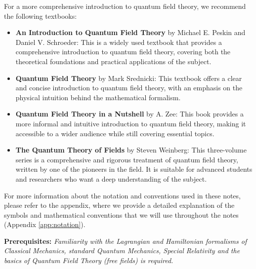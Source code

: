 For a more comprehensive introduction to quantum field theory, we recommend the following textbooks:\
\begin{itemize}
    \item \textbf{An Introduction to Quantum Field Theory} by Michael E. Peskin and Daniel V. Schroeder: This is a widely used textbook that provides a comprehensive introduction to quantum field theory, covering both the theoretical foundations and practical applications of the subject.
    \item \textbf{Quantum Field Theory} by Mark Srednicki: This textbook offers a clear and concise introduction to quantum field theory, with an emphasis on the physical intuition behind the mathematical formalism.
    \item \textbf{Quantum Field Theory in a Nutshell} by A. Zee: This book provides a more informal and intuitive introduction to quantum field theory, making it accessible to a wider audience while still covering essential topics.
    \item \textbf{The Quantum Theory of Fields} by Steven Weinberg: This three-volume series is a comprehensive and rigorous treatment of quantum field theory, written by one of the pioneers in the field. It is suitable for advanced students and researchers who want a deep understanding of the subject.
\end{itemize}

For more information about the notation and conventions used in these notes, please refer to the appendix, where we provide a detailed explanation of the symbols and mathematical conventions that we will use throughout the notes (Appendix \ref{app:notation}).

\vspace{1cm}
\textbf{Prerequisites:} \textit{Familiarity with the Lagrangian and Hamiltonian formalisms of Classical Mechanics, standard Quantum Mechanics, Special Relativity and the basics of Quantum Field Theory (free fields) is required.}
